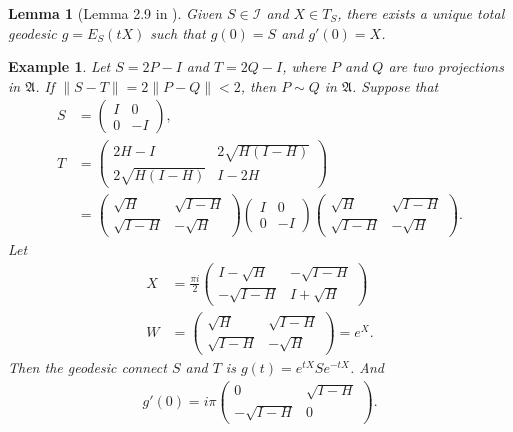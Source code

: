 \documentclass[a4paper,10pt]{amsart}
\newtheorem{example}{Example}[section]
\newtheorem{lemma}{Lemma}[section]
\newcommand{\AAA}{\mathfrak A}
\newcommand{\I}{\mathcal I}
\begin{document}
\begin{lemma}[Lemma 2.9 in \cite{S}]
    Given $S \in \I$ and $X \in T_{S}$, there exists a unique total
    geodesic $g = E_{S}(tX)$ such that $g(0) = S$ and $g'(0) = X$.
\end{lemma}

\begin{example}
   Let $S = 2P -I$ and $T = 2Q-I$, where $P$ and $Q$ are two projections
   in $\AAA$. If $\| S - T\| = 2\|P - Q\| < 2$, then $P \sim Q$ in $\AAA$.
   Suppose that 
   \begin{align*}
       S &= \begin{pmatrix}
          I & 0\\
          0 & -I 
      \end{pmatrix}, \\
      T &= \begin{pmatrix}
          2H-I & 2\sqrt{H(I-H)} \\
          2\sqrt{H(I-H)} & I-2H
      \end{pmatrix} \\
      &=
      \begin{pmatrix}
          \sqrt{H} & \sqrt{I-H} \\
          \sqrt{I-H} & -\sqrt{H} 
      \end{pmatrix}
      \begin{pmatrix}
          I & 0\\
          0 & -I
      \end{pmatrix}
        \begin{pmatrix}
          \sqrt{H} & \sqrt{I-H} \\
          \sqrt{I-H} & -\sqrt{H} 
      \end{pmatrix}.
   \end{align*}
   Let
   \begin{align*}
       X & = \frac{\pi i}{2}\begin{pmatrix}
           I - \sqrt{H} & - \sqrt{I-H}\\
           - \sqrt{I-H} & I + \sqrt{H}
      \end{pmatrix} \\
      W &= \begin{pmatrix}
          \sqrt{H} & \sqrt{I-H} \\
          \sqrt{I-H} & -\sqrt{H} 
      \end{pmatrix} = e^{X}.  
   \end{align*}
   Then the geodesic connect $S$ and $T$ is
   $g(t) = e^{tX}Se^{-tX}$. And
   \begin{align*}
       g'(0) = i\pi \begin{pmatrix}
           0 & \sqrt{I-H}\\
           -\sqrt{I-H} & 0
       \end{pmatrix}. 
   \end{align*}
\end{example}
\end{document}
